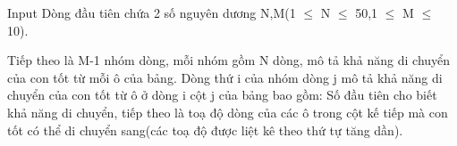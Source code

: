 Input
Dòng đầu tiên chứa 2 số nguyên dương N,M(1 $\le$ N $\le$ 50,1 $\le$ M $\le$ 10).  

   Tiếp theo là M-1 nhóm dòng, mỗi nhóm gồm N dòng, mô tả khả năng di chuyển của con tốt từ mỗi ô của bảng. Dòng thứ i của nhóm dòng j mô tả khả năng di chuyển của con tốt từ ô ở dòng i cột j của bảng bao gồm: Số đầu tiên cho biết khả năng di chuyển, tiếp theo là toạ độ dòng của các ô trong cột kế tiếp mà con tốt có thể di chuyển sang(các toạ độ được liệt kê theo thứ tự tăng dần).